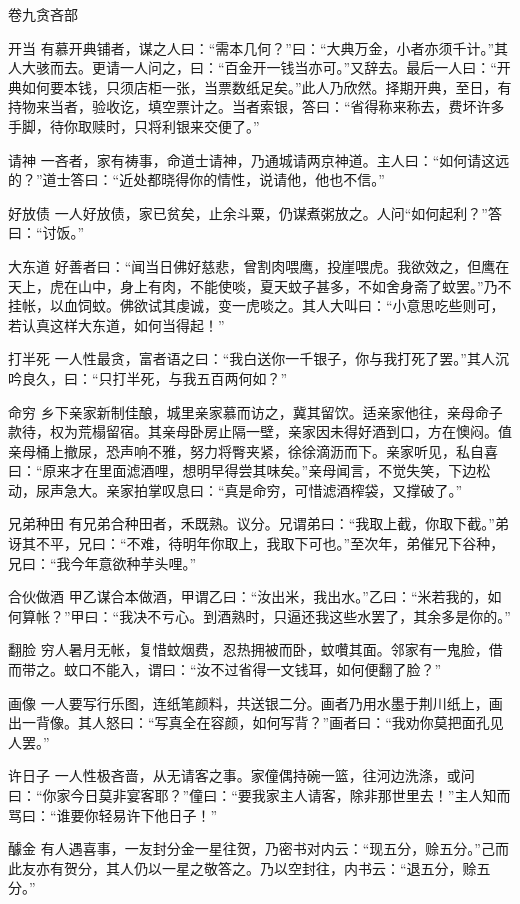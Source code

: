 \documentclass[12pt,UTF8]{ctexbook}
\begin{document}
卷九贪吝部

开当
有慕开典铺者，谋之人曰：“需本几何？”曰：“大典万金，小者亦须千计。”其人大骇而去。更请一人问之，曰：“百金开一钱当亦可。”又辞去。最后一人曰：“开典如何要本钱，只须店柜一张，当票数纸足矣。”此人乃欣然。择期开典，至日，有持物来当者，验收讫，填空票计之。当者索银，答曰：“省得称来称去，费坏许多手脚，待你取赎时，只将利银来交便了。”

请神
一吝者，家有祷事，命道士请神，乃通城请两京神道。主人曰：“如何请这远的？”道士答曰：“近处都晓得你的情性，说请他，他也不信。”

好放债
一人好放债，家已贫矣，止余斗粟，仍谋煮粥放之。人问“如何起利？”答曰：“讨饭。”

大东道
好善者曰：“闻当日佛好慈悲，曾割肉喂鹰，投崖喂虎。我欲效之，但鹰在天上，虎在山中，身上有肉，不能使啖，夏天蚊子甚多，不如舍身斋了蚊罢。”乃不挂帐，以血饲蚊。佛欲试其虔诚，变一虎啖之。其人大叫曰：“小意思吃些则可，若认真这样大东道，如何当得起！”

打半死
一人性最贪，富者语之曰：“我白送你一千银子，你与我打死了罢。”其人沉吟良久，曰：“只打半死，与我五百两何如？”

命穷
乡下亲家新制佳酿，城里亲家慕而访之，冀其留饮。适亲家他往，亲母命子款待，权为荒榻留宿。其亲母卧房止隔一壁，亲家因未得好酒到口，方在懊闷。值亲母桶上撤尿，恐声响不雅，努力将臀夹紧，徐徐滴沥而下。亲家听见，私自喜曰：“原来才在里面滤酒哩，想明早得尝其味矣。”亲母闻言，不觉失笑，下边松动，尿声急大。亲家拍掌叹息曰：“真是命穷，可惜滤酒榨袋，又撑破了。”

兄弟种田
有兄弟合种田者，禾既熟。议分。兄谓弟曰：“我取上截，你取下截。”弟讶其不平，兄曰：“不难，待明年你取上，我取下可也。”至次年，弟催兄下谷种，兄曰：“我今年意欲种芋头哩。”

合伙做酒
甲乙谋合本做酒，甲谓乙曰：“汝出米，我出水。”乙曰：“米若我的，如何算帐？”甲曰：“我决不亏心。到酒熟时，只逼还我这些水罢了，其余多是你的。”

翻脸
穷人暑月无帐，复惜蚊烟费，忍热拥被而卧，蚊囋其面。邻家有一鬼脸，借而带之。蚊口不能入，谓曰：“汝不过省得一文钱耳，如何便翻了脸？”

画像
一人要写行乐图，连纸笔颜料，共送银二分。画者乃用水墨于荆川纸上，画出一背像。其人怒曰：“写真全在容颜，如何写背？”画者曰：“我劝你莫把面孔见人罢。”

许日子
一人性极吝啬，从无请客之事。家僮偶持碗一篮，往河边洗涤，或问曰：“你家今日莫非宴客耶？”僮曰：“要我家主人请客，除非那世里去！”主人知而骂曰：“谁要你轻易许下他日子！”

醵金
有人遇喜事，一友封分金一星往贺，乃密书对内云：“现五分，赊五分。”己而此友亦有贺分，其人仍以一星之敬答之。乃以空封往，内书云：“退五分，赊五分。”
\end{document}
